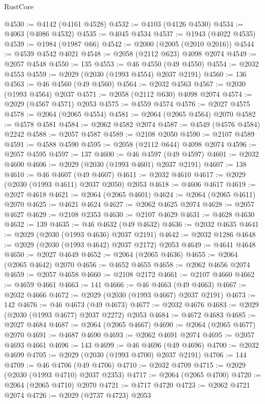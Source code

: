 \begin{lexlean}{RustCore}
\begin{coremodule}
@4530 := @4142 (@4161 @4528)
@4532 := @4103 (@4126 @4530)
@4534 := @4063 (@4086 @4532)
@4535 := @4045 @4534
@4537 := @1943 (@4022 @4535)
@4539 := @1984 (@1987 @66)
@4542 := @2000 (@2005 (@2010 @2016))
@4544 := @4539 @4542 @4021
@4548 := @2058 (@2112 @623) @4098 @2074
@4549 := @2057 @4548
@4550 := 135
@4553 := @46 @4550 (@49 @4550)
@4554 := @2032 @4553
@4559 := @2029 (@2030 (@1993 @4554) @2037 @2191)
@4560 := 136
@4563 := @46 @4560 (@49 @4560)
@4564 := @2032 @4563
@4567 := @2030 (@1993 @4564) @2037
@4571 := @2058 (@2112 @630) @4098 @2074
@4574 := @2029 (@4567 @4571) @2053
@4575 := @4559 @4574
@4576 := @2027 @4575
@4578 := @2064 (@2065 @4554)
@4581 := @2064 (@2065 @4564) @2070
@4582 := @4578 @4581
@4584 := @2062 @4582 @2074
@4587 := @4549 (@4576 @4584) @2242
@4588 := @2057 @4587
@4589 := @2108 @2050
@4590 := @2107 @4589
@4591 := @4588 @4590
@4595 := @2058 (@2112 @644) @4098 @2074
@4596 := @2057 @4595
@4597 := 137
@4600 := @46 @4597 (@49 @4597)
@4601 := @2032 @4600
@4606 := @2029 (@2030 (@1993 @4601) @2037 @2191)
@4607 := 138
@4610 := @46 @4607 (@49 @4607)
@4611 := @2032 @4610
@4617 := @2029 (@2030 (@1993 @4611) @2037 @2050) @2053
@4618 := @4606 @4617
@4619 := @2027 @4618
@4621 := @2064 (@2065 @4601)
@4624 := @2064 (@2065 @4611) @2070
@4625 := @4621 @4624
@4627 := @2062 @4625 @2074
@4628 := @2057 @4627
@4629 := @2108 @2353
@4630 := @2107 @4629
@4631 := @4628 @4630
@4632 := 139
@4635 := @46 @4632 (@49 @4632)
@4636 := @2032 @4635
@4641 := @2029 (@2030 (@1993 @4636) @2037 @2191)
@4642 := @2032 @1286
@4648 := @2029 (@2030 (@1993 @4642) @2037 @2172) @2053
@4649 := @4641 @4648
@4650 := @2027 @4649
@4652 := @2064 (@2065 @4636)
@4655 := @2064 (@2065 @4642) @2070
@4656 := @4652 @4655
@4658 := @2062 @4656 @2074
@4659 := @2057 @4658
@4660 := @2108 @2172
@4661 := @2107 @4660
@4662 := @4659 @4661
@4663 := 141
@4666 := @46 @4663 (@49 @4663)
@4667 := @2032 @4666
@4672 := @2029 (@2030 (@1993 @4667) @2037 @2191)
@4673 := 142
@4676 := @46 @4673 (@49 @4673)
@4677 := @2032 @4676
@4683 := @2029 (@2030 (@1993 @4677) @2037 @2272) @2053
@4684 := @4672 @4683
@4685 := @2027 @4684
@4687 := @2064 (@2065 @4667)
@4690 := @2064 (@2065 @4677) @2070
@4691 := @4687 @4690
@4693 := @2062 @4691 @2074
@4695 := @2057 @4693 @4661
@4696 := 143
@4699 := @46 @4696 (@49 @4696)
@4700 := @2032 @4699
@4705 := @2029 (@2030 (@1993 @4700) @2037 @2191)
@4706 := 144
@4709 := @46 @4706 (@49 @4706)
@4710 := @2032 @4709
@4715 := @2029 (@2030 (@1993 @4710) @2037 @2353)
@4717 := @2064 (@2065 @4700)
@4720 := @2064 (@2065 @4710) @2070
@4721 := @4717 @4720
@4723 := @2062 @4721 @2074
@4726 := @2029 (@2737 @4723) @2053

\end{coremodule}
\end{lexlean}
